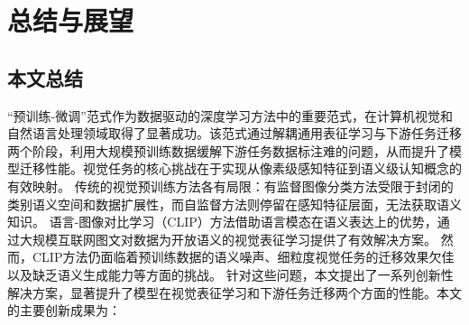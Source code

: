 \chapter{总结与展望}

\section{本文总结}
“预训练-微调”范式作为数据驱动的深度学习方法中的重要范式，在计算机视觉和自然语言处理领域取得了显著成功。该范式通过解耦通用表征学习与下游任务迁移两个阶段，利用大规模预训练数据缓解下游任务数据标注难的问题，从而提升了模型迁移性能。视觉任务的核心挑战在于实现从像素级感知特征到语义级认知概念的有效映射。
传统的视觉预训练方法各有局限：有监督图像分类方法受限于封闭的类别语义空间和数据扩展性，而自监督方法则停留在感知特征层面，无法获取语义知识。
语言-图像对比学习（CLIP）方法借助语言模态在语义表达上的优势，通过大规模互联网图文对数据为开放语义的视觉表征学习提供了有效解决方案。
然而，CLIP方法仍面临着预训练数据的语义噪声、细粒度视觉任务的迁移效果欠佳以及缺乏语义生成能力等方面的挑战。
针对这些问题，本文提出了一系列创新性解决方案，显著提升了模型在视觉表征学习和下游任务迁移两个方面的性能。本文的主要创新成果为：

